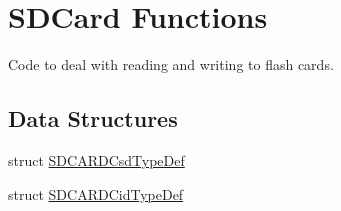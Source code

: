 \hypertarget{group___p_i_o_s___s_d_c_a_r_d}{\section{S\-D\-Card Functions}
\label{group___p_i_o_s___s_d_c_a_r_d}
}


Code to deal with reading and writing to flash cards.  


\subsection*{Data Structures}
\begin{DoxyCompactItemize}
\item 
struct \hyperlink{struct_s_d_c_a_r_d_csd_type_def}{S\-D\-C\-A\-R\-D\-Csd\-Type\-Def}
\item 
struct \hyperlink{struct_s_d_c_a_r_d_cid_type_def}{S\-D\-C\-A\-R\-D\-Cid\-Type\-Def}
\end{DoxyCompactItemize}
